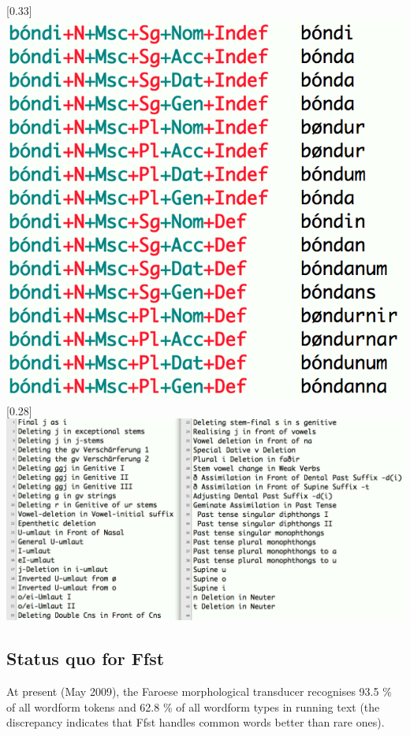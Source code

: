 \documentclass{article}
\begin{document}
\scalebox{0.33}[0.33]{\includegraphics{img/bondiparadigm.png}} \\

\scalebox{0.29}[0.28]{\includegraphics{img/twolrules.png}} \\

\subsection{Status quo for Ffst}


At present (May 2009), the Faroese morphological transducer recognises 93.5 \% of all wordform tokens and 62.8 \% of all wordform types in running text (the discrepancy indicates that Ffst handles common words better than rare ones). 
\end{document}
